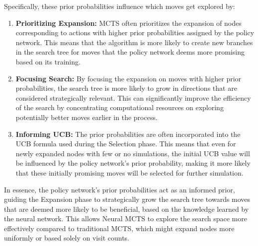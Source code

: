 \begin{itemize}
Specifically, these prior probabilities influence which moves get explored by:

\begin{enumerate}
    \item \textbf{Prioritizing Expansion:} MCTS often prioritizes the expansion of nodes corresponding to actions with higher prior probabilities assigned by the policy network. This means that the algorithm is more likely to create new branches in the search tree for moves that the policy network deems more promising based on its training.
    \item \textbf{Focusing Search:} By focusing the expansion on moves with higher prior probabilities, the search tree is more likely to grow in directions that are considered strategically relevant. This can significantly improve the efficiency of the search by concentrating computational resources on exploring potentially better moves earlier in the process.
    \item \textbf{Informing UCB:} The prior probabilities are often incorporated into the UCB formula used during the Selection phase. This means that even for newly expanded nodes with few or no simulations, the initial UCB value will be influenced by the policy network's prior probability, making it more likely that these initially promising moves will be selected for further simulation.
\end{enumerate}

In essence, the policy network's prior probabilities act as an informed prior, guiding the Expansion phase to strategically grow the search tree towards moves that are deemed more likely to be beneficial, based on the knowledge learned by the neural network. This allows Neural MCTS to explore the search space more effectively compared to traditional MCTS, which might expand nodes more uniformly or based solely on visit counts.
\end{itemize}


